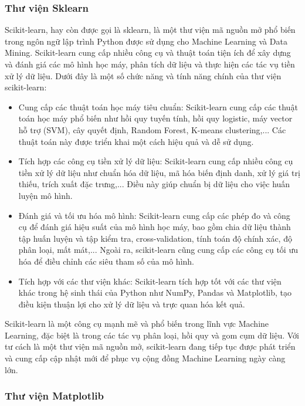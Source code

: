 \subsubsection{Thư viện Sklearn}

Scikit-learn, hay còn được gọi là sklearn, là một thư viện mã nguồn mở phổ biến trong ngôn ngữ lập trình Python được sử dụng cho Machine Learning và Data Mining. Scikit-learn cung cấp nhiều công cụ và thuật toán tiện ích để xây dựng và đánh giá các mô hình học máy, phân tích dữ liệu và thực hiện các tác vụ tiền xử lý dữ liệu. Dưới đây là một số chức năng và tính năng chính của thư viện scikit-learn:

\begin{itemize}
	\item Cung cấp các thuật toán học máy tiêu chuẩn: Scikit-learn cung cấp các thuật toán học máy phổ biến như hồi quy tuyến tính, hồi quy logistic, máy vector hỗ trợ (SVM), cây quyết định, Random Forest, K-means clustering,... Các thuật toán này được triển khai một cách hiệu quả và dễ sử dụng.
	
	\item Tích hợp các công cụ tiền xử lý dữ liệu: Scikit-learn cung cấp nhiều công cụ tiền xử lý dữ liệu như chuẩn hóa dữ liệu, mã hóa biến định danh, xử lý giá trị thiếu, trích xuất đặc trưng,... Điều này giúp chuẩn bị dữ liệu cho việc huấn luyện mô hình.
	
	\item Đánh giá và tối ưu hóa mô hình: Scikit-learn cung cấp các phép đo và công cụ để đánh giá hiệu suất của mô hình học máy, bao gồm chia dữ liệu thành tập huấn luyện và tập kiểm tra, cross-validation, tính toán độ chính xác, độ phân loại, mất mát,... Ngoài ra, scikit-learn cũng cung cấp các công cụ tối ưu hóa để điều chỉnh các siêu tham số của mô hình.
	
	\item Tích hợp với các thư viện khác: Scikit-learn tích hợp tốt với các thư viện khác trong hệ sinh thái của Python như NumPy, Pandas và Matplotlib, tạo điều kiện thuận lợi cho xử lý dữ liệu và trực quan hóa kết quả.
\end{itemize}

Scikit-learn là một công cụ mạnh mẽ và phổ biến trong lĩnh vực Machine Learning, đặc biệt là trong các tác vụ phân loại, hồi quy và gom cụm dữ liệu. Với tư cách là một thư viện mã nguồn mở, scikit-learn đang tiếp tục được phát triển và cung cấp cập nhật mới để phục vụ cộng đồng Machine Learning ngày càng lớn.

\subsubsection{Thư viện Matplotlib}

